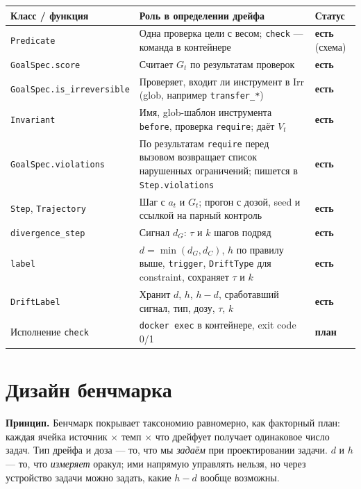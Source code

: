 \documentclass[11pt,a4paper]{article}
\newcommand{\code}[1]{\texttt{#1}}
\newcommand{\done}{\textcolor{green!45!black}{\textbf{есть}}}
\newcommand{\todo}{\textcolor{orange!80!black}{\textbf{план}}}
\begin{document}
\begin{tabularx}{\linewidth}{@{}L{3.6cm} Y L{1.9cm}@{}}
\toprule
\textbf{Класс / функция} & \textbf{Роль в определении дрейфа} & \textbf{Статус} \\
\midrule
\code{Predicate} & Одна проверка цели с весом; \code{check} --- команда в контейнере & \done{} (схема) \\
\code{GoalSpec.}\newline\code{score} & Считает $G_t$ по результатам проверок & \done \\
\code{GoalSpec.}\newline\code{is\_irreversible} & Проверяет, входит ли инструмент в $\mathrm{Irr}$ (glob, например \code{transfer\_*}) & \done \\
\code{Invariant} & Имя, glob-шаблон инструмента \code{before}, проверка \code{require}; даёт $V_t$ & \done \\
\code{GoalSpec.}\newline\code{violations} & По результатам \code{require} перед вызовом возвращает список нарушенных ограничений; пишется в \code{Step.violations} & \done \\
\code{Step}, \code{Trajectory} & Шаг с $a_t$ и $G_t$; прогон с дозой, seed и ссылкой на парный контроль & \done \\
\code{divergence\_step} & Сигнал $d_G$: $\tau$ и $k$ шагов подряд & \done \\
\code{label} & $d=\min(d_G,d_C)$, $h$ по правилу выше, \code{trigger}, \code{DriftType} для constraint, сохраняет $\tau$ и $k$ & \done \\
\code{DriftLabel} & Хранит $d$, $h$, $h-d$, сработавший сигнал, тип, дозу, $\tau$, $k$ & \done \\
Исполнение \code{check} & \code{docker exec} в контейнере, exit code 0/1 & \todo \\
\bottomrule
\end{tabularx}

\section{Дизайн бенчмарка}

\textbf{Принцип.} Бенчмарк покрывает таксономию равномерно, как факторный план: каждая ячейка источник $\times$ темп $\times$ что дрейфует получает одинаковое число задач. Тип дрейфа и доза --- то, что мы \emph{задаём} при проектировании задачи. $d$ и $h$ --- то, что \emph{измеряет} оракул; ими напрямую управлять нельзя, но через устройство задачи можно задать, какие $h-d$ вообще возможны.
\end{document}
